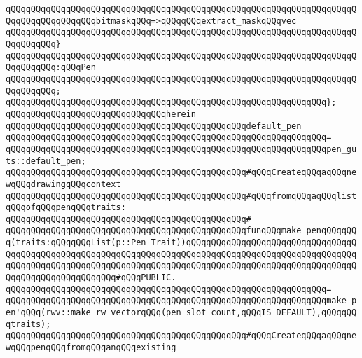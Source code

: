 \verb|qQQqqQQqqQQqqQQqqQQqqQQqqQQqqQQqqQQqqQQqqQQqqQQqqQQqqQQqqQQqqQQqqQQqqQQqqQQqqQQqqQQqqQQqbitmaskqQQq=>qQQqqQQqextract_maskqQQqvec|\newline
\verb|qQQqqQQqqQQqqQQqqQQqqQQqqQQqqQQqqQQqqQQqqQQqqQQqqQQqqQQqqQQqqQQqqQQqqQQqqQQqqQQq}|\newline
\verb|qQQqqQQqqQQqqQQqqQQqqQQqqQQqqQQqqQQqqQQqqQQqqQQqqQQqqQQqqQQqqQQqqQQqqQQqqQQqqQQq:qQQqPen|\newline
\verb|qQQqqQQqqQQqqQQqqQQqqQQqqQQqqQQqqQQqqQQqqQQqqQQqqQQqqQQqqQQqqQQqqQQqqQQqqQQqqQQq;|\newline
\verb|qQQqqQQqqQQqqQQqqQQqqQQqqQQqqQQqqQQqqQQqqQQqqQQqqQQqqQQqqQQqqQQq};|\newline
\newline
\verb|qQQqqQQqqQQqqQQqqQQqqQQqqQQqqQQqherein|\newline
\newline
\verb|qQQqqQQqqQQqqQQqqQQqqQQqqQQqqQQqqQQqqQQqqQQqqQQqdefault_pen|\newline
\verb|qQQqqQQqqQQqqQQqqQQqqQQqqQQqqQQqqQQqqQQqqQQqqQQqqQQqqQQqqQQqqQQq=|\newline
\verb|qQQqqQQqqQQqqQQqqQQqqQQqqQQqqQQqqQQqqQQqqQQqqQQqqQQqqQQqqQQqqQQqpen_guts::default_pen;|\newline
\newline
\newline
\verb|qQQqqQQqqQQqqQQqqQQqqQQqqQQqqQQqqQQqqQQqqQQqqQQq#qQQqCreateqQQqaqQQqnewqQQqdrawingqQQqcontext|\newline
\verb|qQQqqQQqqQQqqQQqqQQqqQQqqQQqqQQqqQQqqQQqqQQqqQQq#qQQqfromqQQqaqQQqlistqQQqofqQQqpenqQQqtraits:|\newline
\verb|qQQqqQQqqQQqqQQqqQQqqQQqqQQqqQQqqQQqqQQqqQQqqQQq#|\newline
\verb|qQQqqQQqqQQqqQQqqQQqqQQqqQQqqQQqqQQqqQQqqQQqqQQqfunqQQqmake_penqQQqqQQq(traits:qQQqqQQqList(p::Pen_Trait))qQQqqQQqqQQqqQQqqQQqqQQqqQQqqQQqqQQqqQQqqQQqqQQqqQQqqQQqqQQqqQQqqQQqqQQqqQQqqQQqqQQqqQQqqQQqqQQqqQQqqQQqqQQqqQQqqQQqqQQqqQQqqQQqqQQqqQQqqQQqqQQqqQQqqQQqqQQqqQQqqQQqqQQqqQQqqQQqqQQqqQQqqQQqqQQqqQQq#qQQqPUBLIC.|\newline
\verb|qQQqqQQqqQQqqQQqqQQqqQQqqQQqqQQqqQQqqQQqqQQqqQQqqQQqqQQqqQQqqQQq=|\newline
\verb|qQQqqQQqqQQqqQQqqQQqqQQqqQQqqQQqqQQqqQQqqQQqqQQqqQQqqQQqqQQqqQQqmake_pen'qQQq(rwv::make_rw_vectorqQQq(pen_slot_count,qQQqIS_DEFAULT),qQQqqQQqtraits);|\newline
\newline
\newline
\verb|qQQqqQQqqQQqqQQqqQQqqQQqqQQqqQQqqQQqqQQqqQQqqQQq#qQQqCreateqQQqaqQQqnewqQQqpenqQQqfromqQQqanqQQqexisting|\newline
